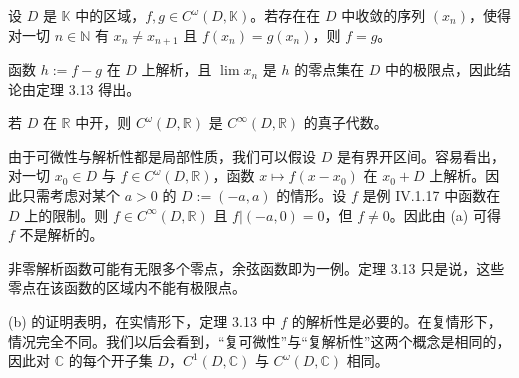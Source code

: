\begin{remark}

\begin{items}
\item

设 $D$ 是 $\mathbb{K}$ 中的区域，$f, g \in C^\omega(D, \mathbb{K})$。若存在在 $D$ 中收敛的序列 $(x_n)$，使得对一切 $n \in \mathbb{N}$ 有 $x_n \neq x_{n+1}$ 且 $f(x_n) = g(x_n)$，则 $f = g$。

\proofhead
函数 $ h := f - g $ 在 $ D $ 上解析，且 $ \lim x_n $ 是 $ h $ 的零点集在 $ D $ 中的极限点，因此结论由定理 3.13 得出。
\item

若 $D$ 在 $\mathbb{R}$ 中开，则 $C^\omega(D,\mathbb{R})$ 是 $C^\infty(D,\mathbb{R})$ 的真子代数。

\proofhead
由于可微性与解析性都是局部性质，我们可以假设 $D$ 是有界开区间。容易看出，对一切 $x_0 \in D$ 与 $f \in C^\omega(D,\mathbb{R})$，函数 $x \mapsto f(x-x_0)$ 在 $x_0 + D$ 上解析。因此只需考虑对某个 $a > 0$ 的 $D := (-a,a)$ 的情形。设 $f$ 是例 IV.1.17 中函数在 $D$ 上的限制。则 $f \in C^\infty(D,\mathbb{R})$ 且 $f|(-a,0) = 0$，但 $f \neq 0$。因此由 (a) 可得 $f$ 不是解析的。
\item

非零解析函数可能有无限多个零点，余弦函数即为一例。定理 3.13 只是说，这些零点在该函数的区域内不能有极限点。

\item

(b) 的证明表明，在实情形下，定理 3.13 中 $f$ 的解析性是必要的。在复情形下，情况完全不同。我们以后会看到，“复可微性”与“复解析性”这两个概念是相同的，因此对 $\mathbb{C}$ 的每个开子集 $D$，$C^1(D,\mathbb{C})$ 与 $C^\omega(D,\mathbb{C})$ 相同。

\end{items}

\end{remark}

